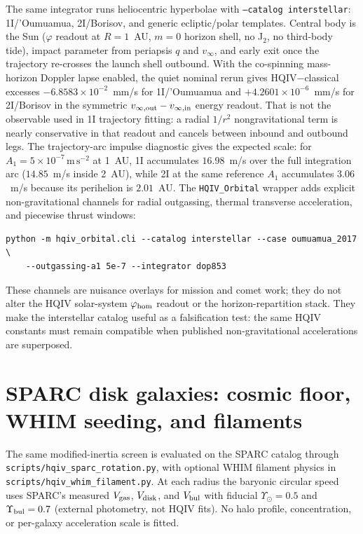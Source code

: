 \documentclass[11pt]{amsart}
\begin{document}
The same integrator runs heliocentric hyperbolae with \texttt{--catalog interstellar}:
1I/'Oumuamua, 2I/Borisov, and generic ecliptic/polar templates. Central body is the Sun
($\varphi$ readout at $R=1$~AU, $m=0$ horizon shell, no J$_2$, no third-body tide), impact
parameter from periapsis $q$ and $v_\infty$, and early exit once the trajectory re-crosses
the launch shell outbound. With the co-spinning mass-horizon Doppler lapse enabled, the
quiet nominal rerun gives HQIV$-$classical excesses
\(-6.8583\times10^{-2}\)~mm/s for 1I/'Oumuamua and
\(+4.2601\times10^{-6}\)~mm/s for 2I/Borisov in the symmetric
\(v_{\infty,\rm out}-v_{\infty,\rm in}\) energy readout. That is not the observable used in
1I trajectory fitting: a radial \(1/r^2\) nongravitational term is nearly conservative in
that readout and cancels between inbound and outbound legs. The trajectory-arc impulse
diagnostic gives the expected scale: for \(A_1=5\times10^{-7}\,\mathrm{m\,s^{-2}}\) at
1~AU, 1I accumulates \(16.98\)~m/s over the full integration arc (\(14.85\)~m/s inside
2~AU), while 2I at the same reference \(A_1\) accumulates \(3.06\)~m/s because its perihelion
is \(2.01\)~AU. The \texttt{HQIV\_Orbital} wrapper adds explicit
non-gravitational channels for radial outgassing, thermal transverse acceleration, and
piecewise thrust windows:
\begin{verbatim}
python -m hqiv_orbital.cli --catalog interstellar --case oumuamua_2017 \
    --outgassing-a1 5e-7 --integrator dop853
\end{verbatim}
These channels are nuisance overlays for mission and comet work; they do not alter the HQIV
solar-system $\varphi_{\rm hom}$ readout or the horizon-repartition stack. They make the interstellar catalog useful as
a falsification test: the same HQIV constants must remain compatible when published
non-gravitational accelerations are superposed.

\section{SPARC disk galaxies: cosmic floor, WHIM seeding, and filaments}\label{sec:galaxies}

The same modified-inertia screen is evaluated on the SPARC catalog \cite{lelli2016sparc}
through \texttt{scripts/hqiv\_sparc\_rotation.py}, with optional WHIM filament physics in
\texttt{scripts/hqiv\_whim\_filament.py}. At each radius the baryonic circular speed
uses SPARC's measured $V_{\rm gas}$, $V_{\rm disk}$, and $V_{\rm bul}$ with fiducial
$\Upsilon_\odot=0.5$ and $\Upsilon_{\rm bul}=0.7$ (external photometry, not HQIV fits).
No halo profile, concentration, or per-galaxy acceleration scale is fitted.
\end{document}
